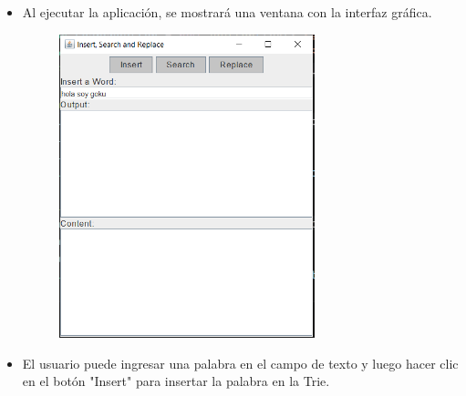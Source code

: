 \documentclass{article}
\begin{document}
	\begin{itemize}
		\item Al ejecutar la aplicación, se mostrará una ventana con la interfaz gráfica.
		\begin{figure}[H]
		\centering
		\includegraphics[width=0.7\textwidth, height=0.7\textwidth,keepaspectratio]{pruebas/visual2.png}
		\end{figure}
		\clearpage
		
		\item El usuario puede ingresar una palabra en el campo de texto y luego hacer clic en el botón "Insert" para insertar la palabra en la Trie.
		

\end{itemize}
\end{document}
